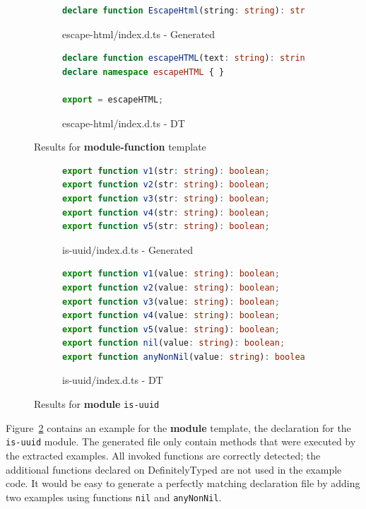\documentclass[english,cleveref,autoref,submission]{programming}
\newcommand{\figref}[1]{Figure~\ref{#1}}
\begin{document}
\begin{figure}[tp]
\begin{subfigure}[t]{0.48\linewidth}
\begin{lstlisting}[language=TypeScript,numbers=none]
declare function EscapeHtml(string: string): string;

        \end{lstlisting}
        \caption{escape-html/index.d.ts - Generated}
      \end{subfigure}
      \hfill
      \begin{subfigure}[t]{0.48\linewidth}
        \begin{lstlisting}[language=TypeScript,numbers=none]
declare function escapeHTML(text: string): string;
declare namespace escapeHTML { }

export = escapeHTML;
        \end{lstlisting}
        \caption{escape-html/index.d.ts - DT}
      \end{subfigure}

    \caption{Results for \textbf{module-function} template}
    \label{fig:experiments-results-module-function}
\end{figure}
  

\begin{figure}[tp]
    \centering
    \begin{subfigure}[t]{0.48\linewidth}
      \begin{lstlisting}[language=TypeScript,numbers=none]
export function v1(str: string): boolean;
export function v2(str: string): boolean;
export function v3(str: string): boolean;
export function v4(str: string): boolean;
export function v5(str: string): boolean;
      \end{lstlisting}
      \caption{is-uuid/index.d.ts - Generated}
    \end{subfigure}
    \hfill
    \begin{subfigure}[t]{0.48\linewidth}
      \begin{lstlisting}[language=TypeScript,numbers=none]
export function v1(value: string): boolean;
export function v2(value: string): boolean;
export function v3(value: string): boolean;
export function v4(value: string): boolean;
export function v5(value: string): boolean;
export function nil(value: string): boolean;
export function anyNonNil(value: string): boolean;
      \end{lstlisting}
      \caption{is-uuid/index.d.ts - DT}
    \end{subfigure}

    \caption{Results for \textbf{module} \texttt{is-uuid}}
    \label{fig:experiments-results-module-is-uuid}
\end{figure}

\figref{fig:experiments-results-module-is-uuid} contains an example
for the \textbf{module} template, the declaration for the \texttt{is-uuid} module.
The generated file only contain methods that were executed by the extracted
examples. All invoked functions are correctly detected; the additional
functions declared on DefinitelyTyped are not used in the example
code.
It would be easy to generate a perfectly matching declaration file by
adding two examples using functions \texttt{nil} and
\texttt{anyNonNil}. 
\end{document}

